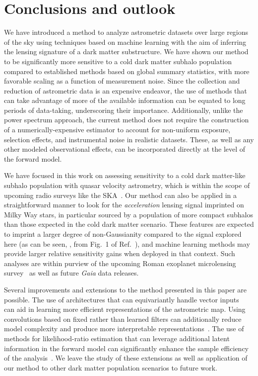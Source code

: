 \documentclass[]{article}
\begin{document}
\section{Conclusions and outlook}
\label{sec:conclusions}

We have introduced a method to analyze astrometric datasets over large regions of the sky using techniques based on machine learning with the aim of inferring the lensing signature of a dark matter substructure. We have shown our method to be significantly more sensitive to a cold dark matter subhalo population compared to established methods based on global summary statistics, with more favorable scaling as a function of measurement noise. Since the collection and reduction of astrometric data is an expensive endeavor, the use of methods that can take advantage of more of the available information can be equated to long periods of data-taking, underscoring their importance. Additionally, unlike the power spectrum approach, the current method does not require the construction of a numerically-expensive estimator to account for non-uniform exposure, selection effects, and instrumental noise in realistic datasets. These, as well as any other modeled observational effects, can be incorporated directly at the level of the forward model. 

We have focused in this work on assessing sensitivity to a cold dark matter-like subhalo population with quasar velocity astrometry, which is within the scope of upcoming radio surveys like the SKA~\citep{Fomalont:2004hr,Jarvis:2015tqa}. Our method can also be applied in a straightforward manner to look for the \emph{acceleration} lensing signal imprinted on Milky Way stars, in particular sourced by a population of more compact subhalos than those expected in the cold dark matter scenario. These features are expected to imprint a larger degree of non-Gaussianity compared to the signal explored here (as can be seen, \eg, from Fig.~1 of Ref.~\cite{Mishra-Sharma:2020ynk}), and machine learning methods may provide larger relative sensitivity gains when deployed in that context. Such analyses are within purview of the upcoming Roman exoplanet microlensing survey~\citep{Pardo:2021uzy} as well as future \emph{Gaia} data releases.

Several improvements and extensions to the method presented in this paper are possible. The use of architectures that can equivariantly handle vector inputs~\citep{esteves2020spinweighted} can aid in learning more efficient representations of the astrometric map. Using convolutions based on fixed rather than learned filters can additionally reduce model complexity and produce more interpretable representations~\citep{Cheng:2020qbx,2021arXiv210709145H,2021arXiv210411244S,2021arXiv210202828M,Valogiannis:2021chp}. The use of methods for likelihood-ratio estimation that can leverage additional latent information in the forward model can significantly enhance the sample efficiency of the analysis~\citep{Brehmer:2018eca,Brehmer:2018hga,Brehmer:2018kdj,Stoye:2018ovl}. We leave the study of these extensions as well as application of our method to other dark matter population scenarios to future work.
\end{document}
